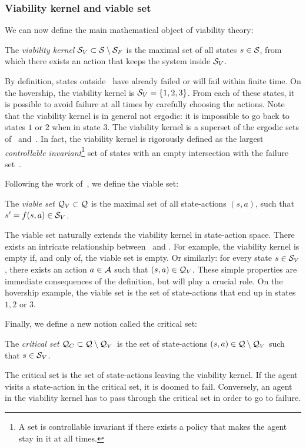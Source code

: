 	\subsubsection{Viability kernel and viable set}
	We can now define the main mathematical object of viability theory:
	\begin{definition}
		The \emph{viability kernel} $\SV\subset\S\setminus\SF$ is the maximal set of all states $s\in\S$, from which there exists an action that keeps the system inside $\SV$\cite[Chapter~1]{aubin2011viability}.
	\end{definition}
	By definition, states outside \SV~have already failed or will fail within finite time. On the hovership, the viability kernel is $\SV = \{1, 2, 3\}$. From each of these states, it is possible to avoid failure at all times by carefully choosing the actions. Note that the viability kernel is in general not ergodic: it is impossible to go back to states $1$ or $2$ when in state $3$. The viability kernel is a superset of the ergodic sets of~\cite{moldovan2012safe} and~\cite{turchetta2016safe}. In fact, the viability kernel is rigorously defined as the largest\emph{ controllable invariant}\footnote{A set is controllable invariant if there exists a policy that makes the agent stay in it at all times.} set of states with an empty intersection with the failure set~\cite{aubin2011viability}.\par
	Following the work of~\cite{heim2020learnable}, we define the viable set:
	\begin{definition}
		The \emph{viable set} $\QV\subset\Q$ is the maximal set of all state-actions $(s, a)$, such that $s' = f(s, a) \in\SV$.
	\end{definition}
	The viable set naturally extends the viability kernel in state-action space. There exists an intricate relationship between \SV~and \QV. For example, the viability kernel is empty if, and only of, the viable set is empty. Or similarly: for every state $s \in \SV$, there exists an action $a\in\A$ such that $(s, a) \in \QV$. These simple properties are immediate consequences of the definition, but will play a crucial role. On the hovership example, the viable set is the set of state-actions that end up in states $1, 2$ or $3$.\par
	Finally, we define a new notion called the critical set:
	\begin{definition}
		The\emph{ critical set} $\QC\subset\Q\setminus\QV$~is the set of state-actions $(s, a)\in\Q\setminus\QV$ such that $s\in\SV$.
	\end{definition}
	The critical set is the set of state-actions leaving the viability kernel. If the agent visits a state-action in the critical set, it is doomed to fail. Conversely, an agent in the viability kernel has to pass through the critical set in order to go to failure.
